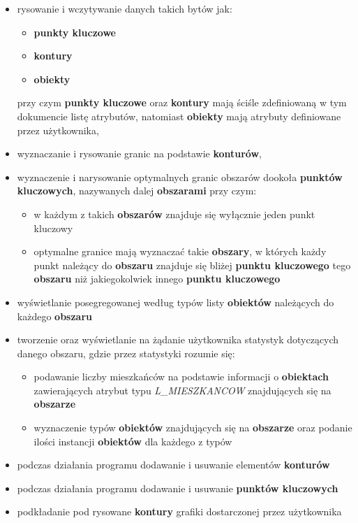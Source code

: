 \documentclass[a4paper, 10pt, titlepage]{article}
\begin{document}
\begin{itemize}
\item rysowanie i wczytywanie danych takich bytów jak:
\begin{itemize}
\item \textbf{punkty kluczowe}
\item \textbf{kontury}
\item \textbf{obiekty}
\end{itemize}
przy czym \textbf{punkty kluczowe} oraz \textbf{kontury} mają ściśle zdefiniowaną w tym dokumencie listę atrybutów, natomiast \textbf{obiekty} mają atrybuty definiowane przez użytkownika,
\item wyznaczanie i rysowanie granic na podstawie \textbf{konturów},
\item wyznaczenie i narysowanie optymalnych granic obszarów dookoła \textbf{punktów kluczowych}, nazywanych dalej \textbf{obszarami} przy czym:
\begin{itemize}
\item w każdym z takich \textbf{obszarów} znajduje się wyłącznie jeden punkt kluczowy
\item optymalne granice mają wyznaczać takie \textbf{obszary}, w których każdy punkt należący do \textbf{obszaru} znajduje się bliżej \textbf{punktu kluczowego} tego \textbf{obszaru} niż jakiegokolwiek innego \textbf{punktu kluczowego}
\end{itemize}
\item wyświetlanie posegregowanej według typów listy \textbf{obiektów} należących do każdego \textbf{obszaru}
\item tworzenie oraz wyświetlanie na żądanie użytkownika statystyk dotyczących danego obszaru, gdzie przez statystyki rozumie się:
\begin{itemize}
\item podawanie liczby mieszkańców na podstawie informacji o \textbf{obiektach} zawierających atrybut typu \textit{L\_MIESZKANCOW} znajdujących się na \textbf{obszarze} 
\item wyznaczenie typów \textbf{obiektów} znajdujących się na \textbf{obszarze} oraz podanie ilości instancji \textbf{obiektów} dla każdego z typów
\end{itemize}
\item podczas działania programu dodawanie i usuwanie elementów \textbf{konturów}
\item podczas działania programu dodawanie i usuwanie \textbf{punktów kluczowych} 
\item podkładanie pod rysowane \textbf{kontury} grafiki dostarczonej przez użytkownika
\end{itemize}
\end{document}
